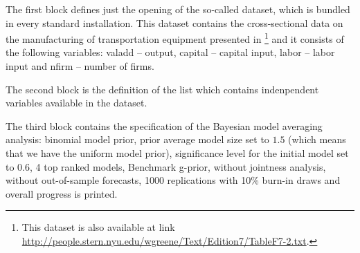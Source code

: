The first block defines just the opening of the so-called 
dataset, which is bundled in every standard 
installation. This dataset contains the cross-sectional data on the
manufacturing of transportation equipment presented in
\cite{greene_Econometric_A}%
\footnote{This dataset is also available at link
	\url{http://people.stern.nyu.edu/wgreene/Text/Edition7/TableF7-2.txt}.}
and it consists of the following variables: valadd -- output, capital
-- capital input, labor -- labor input and nfirm -- number of firms.

The second block is the definition of the  list which
contains indenpendent variables available in the  dataset.

The third block contains the specification of the Bayesian model
averaging analysis: binomial model prior, prior average model size set
to $1.5$ (which means that we have the uniform model prior), significance
level for the initial model set to $0.6$, 4 top ranked models,
Benchmark g-prior, without jointness analysis, without out-of-sample
forecasts, 1000 replications with 10\% burn-in draws and overall
progress is printed.


